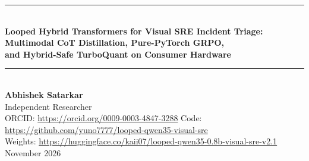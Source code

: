 \documentclass[10pt,letterpaper]{article}
\begin{document}
\begin{center}
\rule{\linewidth}{1.6pt}\\[0.6em]
{\LARGE\bfseries Looped Hybrid Transformers for Visual SRE Incident Triage:\\[0.25em]
\Large Multimodal CoT Distillation, Pure-PyTorch GRPO,\\[0.2em]
and Hybrid-Safe TurboQuant on Consumer Hardware}\\[0.55em]
\rule{\linewidth}{0.8pt}\\[0.9em]
{\large\bfseries Abhishek Satarkar}\\
{\normalsize Independent Researcher}\\
{\small ORCID: \href{https://orcid.org/0009-0003-4847-3288}{https://orcid.org/0009-0003-4847-3288} \;\textbar\; Code: \href{https://github.com/yuno7777/looped-qwen35-visual-sre}{https://github.com/yuno7777/looped-qwen35-visual-sre}}\\
{\small Weights: \href{https://huggingface.co/kaii07/looped-qwen35-0.8b-visual-sre-v2.1}{https://huggingface.co/kaii07/looped-qwen35-0.8b-visual-sre-v2.1}}\\
{\small November 2026}
\end{center}
\vspace{0.5em}
\end{document}

